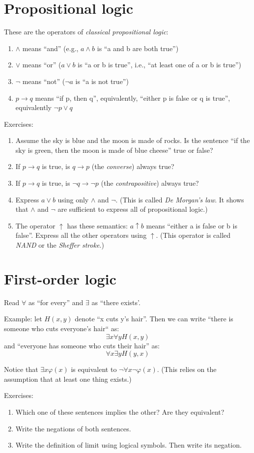 \documentclass[letterpaper,12pt]{article}
\renewcommand{\implies}{\rightarrow}
\renewcommand{\phi}{\varphi}
\begin{document}
\section{Propositional logic}
These are the operators of \emph{classical propositional logic}:
\begin{enumerate}
\item
$\land$ means ``and'' (e.g., $a \land b$ is ``a and b are both true'')
\item
$\lor$ means ``or'' ($a \lor b$ is ``a or b is true'', i.e., ``at least one of a or b is true'')
\item
$\neg$ means ``not'' ($\neg a$ is ``a is not true'')
\item
$p \implies q$ means ``if p, then q'', equivalently, ``either p is false or q is true'', equivalently $\neg p \lor q$
\end{enumerate}

Exercises:
\begin{enumerate}
\item
Assume the sky is blue and the moon is made of rocks. Is the sentence ``if the sky is green, then the moon is made of blue cheese'' true or false?
\item
If $p \implies q$ is true, is $q \implies p$ (the \emph{converse}) always true?
\item
If $p \implies q$ is true, is $\neg q \implies \neg p$ (the \emph{contrapositive}) always true?
\item
Express $a \lor b$ using only $\land$ and $\neg$. (This is called \emph{De Morgan's law}. It shows that $\land$ and $\neg$ are sufficient to express all of propositional logic.)
\item
The operator $\uparrow$ has these semantics: $a \uparrow b$ means ``either a is false or b is false''. Express all the other operators using $\uparrow$. (This operator is called \emph{NAND} or the \emph{Sheffer stroke}.)
\end{enumerate}

\section{First-order logic}
Read $\forall$ as ``for every'' and $\exists$ as ``there exists'.

Example: let $H(x, y)$ denote ``x cuts y's hair''. Then we can write ``there is someone who cuts everyone's hair`` as:
$$\exists x \forall y H(x, y)$$
and ``everyone has someone who cuts their hair'' as:
$$\forall x \exists y H(y, x)$$

Notice that $\exists x \phi(x)$ is equivalent to $\neg \forall x \neg \phi(x)$. (This relies on the assumption that at least one thing exists.)

Exercises:
\begin{enumerate}
\item
Which one of these sentences implies the other? Are they equivalent?
\item
Write the negations of both sentences.
\item
Write the definition of limit using logical symbols. Then write its negation.
\end{enumerate}
\end{document}
